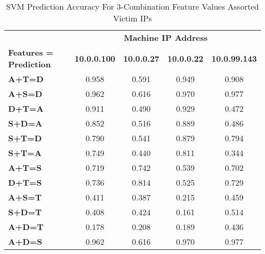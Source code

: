 \begin{table}[!htbp]
	\caption{SVM Prediction Accuracy For 3-Combination Feature Values Assorted Victim IPs}
	\label{table:svm_accuracy}
	\centering
	\begin{tabular}{l|cccc}
		\multicolumn{1}{l|}{} & \multicolumn{4}{c|}{\textbf{Machine IP Address}} \\
		\multicolumn{1}{l|}{\textbf{Features = Prediction}} & \multicolumn{1}{l}{\textbf{10.0.0.100}} & \multicolumn{1}{l}{\textbf{10.0.0.27}} & \multicolumn{1}{l}{\textbf{10.0.0.22}} & \multicolumn{1}{l|}{\textbf{10.0.99.143}} \\ \hline
		\multicolumn{1}{l|}{\textbf{A+T=D}} & \multicolumn{1}{c|}{0.958} & \multicolumn{1}{c|}{0.591} & \multicolumn{1}{c|}{0.949} & \multicolumn{1}{c|}{0.908} \\
		\multicolumn{1}{l|}{\textbf{A+S=D}} & \multicolumn{1}{c|}{0.962} & \multicolumn{1}{c|}{0.616} & \multicolumn{1}{c|}{0.970} & \multicolumn{1}{c|}{0.977} \\
		\multicolumn{1}{l|}{\textbf{D+T=A}} & \multicolumn{1}{c|}{0.911} & \multicolumn{1}{c|}{0.490} & \multicolumn{1}{c|}{0.929} & \multicolumn{1}{c|}{0.472} \\
		\multicolumn{1}{l|}{\textbf{S+D=A}} & \multicolumn{1}{c|}{0.852} & \multicolumn{1}{c|}{0.516} & \multicolumn{1}{c|}{0.889} & \multicolumn{1}{c|}{0.486} \\
		\multicolumn{1}{l|}{\textbf{S+T=D}} & \multicolumn{1}{c|}{0.790} & \multicolumn{1}{c|}{0.541} & \multicolumn{1}{c|}{0.879} & \multicolumn{1}{c|}{0.794} \\
		\multicolumn{1}{l|}{\textbf{S+T=A}} & \multicolumn{1}{c|}{0.749} & \multicolumn{1}{c|}{0.440} & \multicolumn{1}{c|}{0.811} & \multicolumn{1}{c|}{0.344} \\
		\multicolumn{1}{l|}{\textbf{A+T=S}} & \multicolumn{1}{c|}{0.719} & \multicolumn{1}{c|}{0.742} & \multicolumn{1}{c|}{0.539} & \multicolumn{1}{c|}{0.702} \\
		\multicolumn{1}{l|}{\textbf{D+T=S}} & \multicolumn{1}{c|}{0.736} & \multicolumn{1}{c|}{0.814} & \multicolumn{1}{c|}{0.525} & \multicolumn{1}{c|}{0.729} \\
		\multicolumn{1}{l|}{\textbf{A+S=T}} & \multicolumn{1}{c|}{0.411} & \multicolumn{1}{c|}{0.387} & \multicolumn{1}{c|}{0.215} & \multicolumn{1}{c|}{0.459} \\
		\multicolumn{1}{l|}{\textbf{S+D=T}} & \multicolumn{1}{c|}{0.408} & \multicolumn{1}{c|}{0.424} & \multicolumn{1}{c|}{0.161} & \multicolumn{1}{c|}{0.514} \\
		\multicolumn{1}{l|}{\textbf{A+D=T}} & \multicolumn{1}{c|}{0.178} & \multicolumn{1}{c|}{0.208} & \multicolumn{1}{c|}{0.189} & \multicolumn{1}{c|}{0.436} \\
		\multicolumn{1}{l|}{\textbf{A+D=S}} & \multicolumn{1}{c|}{0.962} & \multicolumn{1}{c|}{0.616} & \multicolumn{1}{c|}{0.970} & \multicolumn{1}{c|}{0.977}
	\end{tabular}
\end{table}

